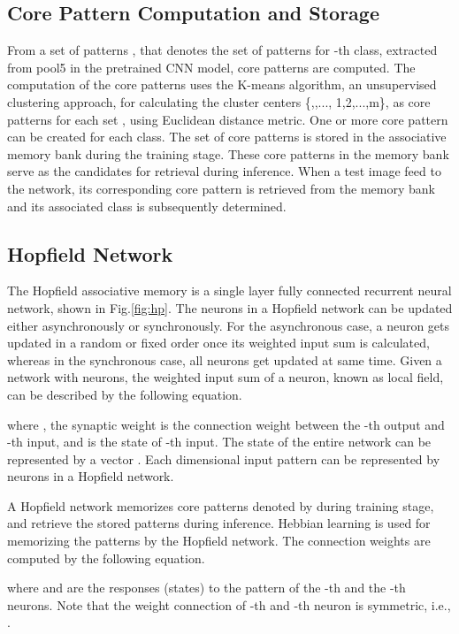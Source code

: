 \documentclass[conference]{IEEEtran}
\begin{document}
\subsection{Core Pattern Computation and Storage}\label{cps}
From a set of  patterns , that denotes the set of patterns for -th class, extracted from pool5 in the pretrained CNN model, core patterns are computed.   The computation of the core patterns uses the  K-means algorithm, an unsupervised clustering approach, for calculating the cluster centers \{,,...,  1,2,...,m\}, as core patterns for each set , using  Euclidean distance metric.  One or more core pattern can be created for each class.  The set of core patterns  is stored in the associative memory bank during the training stage. These core patterns in the memory bank serve as the candidates for   retrieval during inference. When a test image feed to the network, its corresponding core pattern  is retrieved from the  memory bank and its associated class  is  subsequently determined.  

\subsection{Hopfield Network}\label{hn}
The Hopfield associative memory is a single layer fully connected recurrent neural network, shown in Fig.\ref{fig:hp}.  The neurons in  a Hopfield network can be updated either  asynchronously or synchronously. For the asynchronous case, a neuron gets updated in a random or fixed order once its weighted input sum  is calculated, whereas in the synchronous case, all neurons get updated at same time. Given a network with  neurons, the weighted input sum of a neuron, known as local field, can be described by the following equation.

where , the synaptic weight  is  the connection weight between the -th output and -th input, and  is the state of -th input. The state of the entire network can be represented by a vector .  Each   dimensional input pattern   can be  represented by  neurons in  a Hopfield network. 

A Hopfield network memorizes  core patterns  denoted by  during training stage, and retrieve the stored patterns during inference. Hebbian learning  is used for memorizing the patterns by the  Hopfield network. The connection weights  are computed by the following equation.


 where  and  are the responses (states) to the pattern  of the -th and the -th neurons. 
Note that the weight connection of -th and -th neuron is symmetric, i.e.,  .\par
\end{document}
